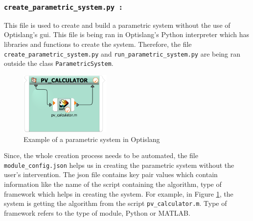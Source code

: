 \subsubsection{\textbf{\texttt{create\_parametric\_system.py :}}}
This file is used to create and build a parametric system without the use of Optislang's \acrshort{gui}. This file is being ran in Optislang's Python interpreter
which has libraries and functions to create the system. Therefore, the file \texttt{create\_parametric\_system.py} and \texttt{run\_parametric\_system.py} 
are being ran outside the class \texttt{ParametricSystem}.
\begin{figure}[!ht]
  \centering
  \includegraphics[width=0.4\textwidth]{Images/parametric_system_pv_calc.png}
  \caption{Example of a parametric system in Optislang}
  \label{parametric_system}
\end{figure}
 
Since, the whole creation process needs to be automated, the file \texttt{module\_config.json} helps us in creating the parametric system without the user's
intervention. The \acrshort{json} file contains key pair values which contain information like the name of the script containing the algorithm, type of framework 
which helps in creating the system. For example, in Figure \ref{parametric_system}, the system is getting the algorithm from the script \texttt{pv\_calculator.m}.
Type of framework refers to the type of module, Python or MATLAB. 

